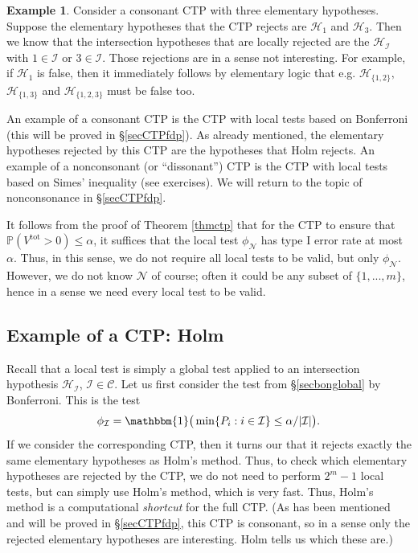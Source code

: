 \documentclass[11pt]{article}
\theoremstyle{plain}
\theoremstyle{definition}
\newtheorem{example}{Example}[section]
\newcommand{\N}{\mathcal{N}}
\newcommand{\I}{\mathcal{I}}
\newcommand{\Hy}{\mathcal{H}}
\newcommand{\pr}{\mathbb{P}}
\newcommand{\subs}{\mathcal{C}}
\begin{document}
\begin{example}
Consider a consonant CTP with three elementary hypotheses. Suppose the elementary hypotheses that the CTP rejects are $\Hy_1$ and $\Hy_3$. Then we know that the intersection hypotheses that are locally rejected are the $\Hy_{\I}$ with $1\in \I$ or $3\in \I$. Those rejections are in a sense not interesting. For example, if $\Hy_1$ is false, then it immediately follows by elementary logic that e.g. $\Hy_{\{1,2\}},$ $\Hy_{\{1,3\}}$ and $\Hy_{\{1,2,3\}}$   must be false too.
\end{example}

An example of a consonant CTP is the CTP with local tests based on Bonferroni (this will be proved in \S\ref{secCTPfdp}). As already mentioned, the elementary hypotheses rejected by this CTP are the hypotheses that Holm rejects. 
 An example of a nonconsonant (or ``dissonant'') CTP is the CTP with local tests based on Simes' inequality (see exercises). We will return to the topic of nonconsonance in \S\ref{secCTPfdp}.

It follows from the proof of Theorem \ref{thmctp} that for the CTP to ensure that $\pr(V^{\text{tot}}>0)\leq \alpha$, it suffices that the local test $\phi_{\N}$ has type I error rate at most $\alpha$. Thus, in this sense, we do not require all local tests to be valid, but only $\phi_{\N}$. However, we do not know $\N$ of course; often it could be any subset of $\{1,...,m\}$, hence in a sense we need every local test to be valid.




\subsection{Example of a CTP: Holm} \label{secCTPHolm}
Recall that a local test is simply a global test applied to an intersection hypothesis $\Hy_{\I}$, $\I\in \subs$. Let us first consider the test from \S\ref{secbonglobal} by Bonferroni. This is the test
\begin{equation} \label{localtestHolm}
\phi_{\I} = \mathbbm{1}\big(\min\{P_i: i\in \I\}\leq \alpha /|\I|\big).
\end{equation}   
If we consider the corresponding CTP, then it turns our that it rejects exactly the same elementary hypotheses as Holm's method. Thus, to check which elementary hypotheses are rejected by the CTP, we do not need to perform $2^m-1$ local tests, but can simply use Holm's method, which is very fast. Thus, Holm's method is a computational \emph{shortcut} for the full CTP. (As has been mentioned and will be proved in \S\ref{secCTPfdp}, this CTP is consonant, so in a sense only the rejected elementary hypotheses are interesting. Holm tells us which these are.)
\end{document}

